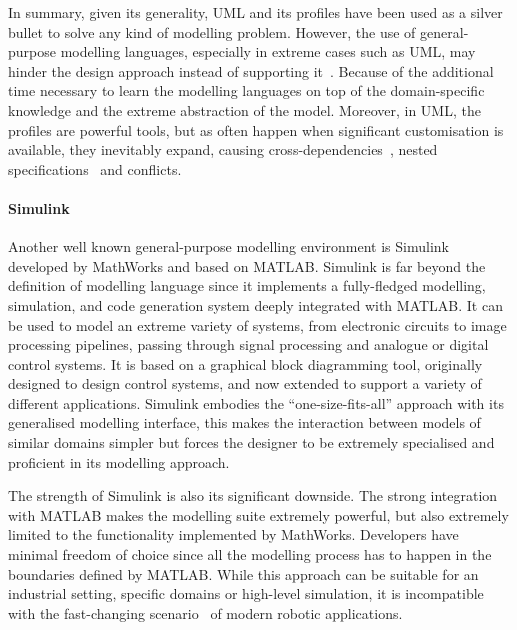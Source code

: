 In summary, given its generality, UML and its profiles have been used as a silver bullet to solve any kind of modelling problem. However, the use of general-purpose modelling languages, especially in extreme cases such as UML, may hinder the design approach instead of supporting it~\cite{simons199930, bonnet2016not}. Because of the additional time necessary to learn the modelling languages on top of the domain-specific knowledge and the extreme abstraction of the model. Moreover, in UML, the profiles are powerful tools, but as often happen when significant customisation is available, they inevitably expand, causing cross-dependencies~\cite{espinoza2009challenges}, nested specifications~\cite{faugere2007marte} and conflicts.

\paragraph{Simulink} Another well known general-purpose modelling environment is Simulink~\cite{dabney2004mastering} developed by MathWorks and based on MATLAB. Simulink is far beyond the definition of modelling language since it implements a fully-fledged modelling, simulation, and code generation system deeply integrated with MATLAB. It can be used to model an extreme variety of systems, from electronic circuits to image processing pipelines, passing through signal processing and analogue or digital control systems. It is based on a graphical block diagramming tool, originally designed to design control systems, and now extended to support a variety of different applications. Simulink embodies the ``one-size-fits-all'' approach with its generalised modelling interface, this makes the interaction between models of similar domains simpler but forces the designer to be extremely specialised and proficient in its modelling approach.

The strength of Simulink is also its significant downside. The strong integration with MATLAB makes the modelling suite extremely powerful, but also extremely limited to the functionality implemented by 
MathWorks. Developers have minimal freedom of choice since all the modelling process has to happen in the boundaries defined by MATLAB. While this approach can be suitable for an industrial setting, specific domains or high-level simulation, it is incompatible with the fast-changing scenario~\cite{cousins2011exponential} of modern robotic applications.


